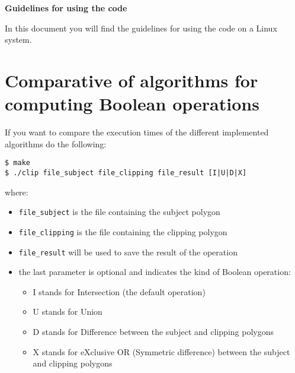 \documentclass[a4paper]{article}
\begin{document}
\lstset{language=C++, basicstyle=\small, showstringspaces=false}

\begin{center}
\textbf{\LARGE Guidelines for using the code}
\end{center}

\vspace{1cm}
\noindent In this document you will find the guidelines for using the code on a Linux system.

%
%

\section{Comparative of algorithms for computing Boolean operations}

If you want to compare the execution times of the different implemented algorithms do the following:

\begin{verbatim}
$ make
$ ./clip file_subject file_clipping file_result [I|U|D|X]
\end{verbatim}

\noindent where:

\begin{itemize}
 \item \verb+file_subject+ is the file containing the subject polygon
 \item \verb+file_clipping+ is the file containing the clipping polygon
 \item \verb+file_result+ will be used to save the result of the operation
 \item the last parameter is optional and indicates the kind of Boolean operation:
   \begin{itemize}
    \item I stands for Intersection (the default operation)
    \item U stands for Union
    \item D stands for Difference between the subject and clipping polygons
    \item X stands for eXclusive OR (Symmetric difference) between the subject and clipping polygons
   \end{itemize}
\end{itemize}
\end{document}
